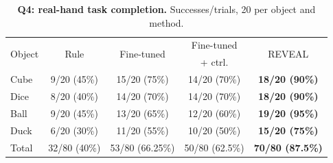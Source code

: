 \begin{table}[!htbp]
\centering\footnotesize
\setlength{\tabcolsep}{2pt}
\begin{tabular}{lcccc}
\toprule
\multirow{2}{*}{Object} & \multirow{2}{*}{Rule} & \multirow{2}{*}{Fine-tuned} & Fine-tuned & \multirow{2}{*}{REVEAL}\\
 & & & + ctrl. & \\
\midrule
Cube & 9/20 (45\%) & 15/20 (75\%) & 14/20 (70\%) & \textbf{18/20 (90\%)}\\
Dice & 8/20 (40\%) & 14/20 (70\%) & 14/20 (70\%) & \textbf{18/20 (90\%)}\\
Ball & 9/20 (45\%) & 13/20 (65\%) & 12/20 (60\%) & \textbf{19/20 (95\%)}\\
Duck & 6/20 (30\%) & 11/20 (55\%) & 10/20 (50\%) & \textbf{15/20 (75\%)}\\
\midrule
Total & 32/80 (40\%) & 53/80 (66.25\%) & 50/80 (62.5\%) & \textbf{70/80 (87.5\%)}\\
\bottomrule
\end{tabular}
\caption{\textbf{Q4: real-hand task completion.} Successes/trials, 20 per object and method.}
\label{tab:hardware-results}
\end{table}

